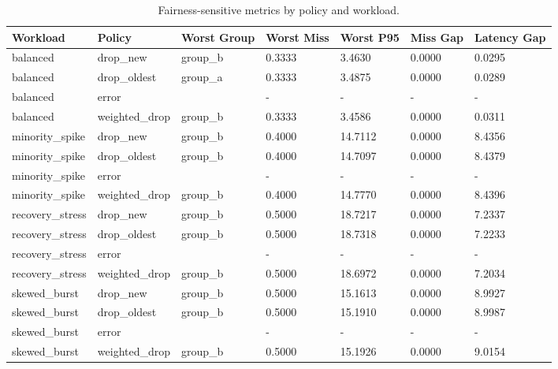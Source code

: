 \begin{table}[t]
\centering
\caption{Fairness-sensitive metrics by policy and workload.}
\label{tab:fairness_metrics}
\begin{tabular}{lllllll}
\hline
Workload & Policy & Worst Group & Worst Miss & Worst P95 & Miss Gap & Latency Gap \\
\hline
balanced & drop\_new & group\_b & 0.3333 & 3.4630 & 0.0000 & 0.0295 \\
balanced & drop\_oldest & group\_a & 0.3333 & 3.4875 & 0.0000 & 0.0289 \\
balanced & error &  & - & - & - & - \\
balanced & weighted\_drop & group\_b & 0.3333 & 3.4586 & 0.0000 & 0.0311 \\
minority\_spike & drop\_new & group\_b & 0.4000 & 14.7112 & 0.0000 & 8.4356 \\
minority\_spike & drop\_oldest & group\_b & 0.4000 & 14.7097 & 0.0000 & 8.4379 \\
minority\_spike & error &  & - & - & - & - \\
minority\_spike & weighted\_drop & group\_b & 0.4000 & 14.7770 & 0.0000 & 8.4396 \\
recovery\_stress & drop\_new & group\_b & 0.5000 & 18.7217 & 0.0000 & 7.2337 \\
recovery\_stress & drop\_oldest & group\_b & 0.5000 & 18.7318 & 0.0000 & 7.2233 \\
recovery\_stress & error &  & - & - & - & - \\
recovery\_stress & weighted\_drop & group\_b & 0.5000 & 18.6972 & 0.0000 & 7.2034 \\
skewed\_burst & drop\_new & group\_b & 0.5000 & 15.1613 & 0.0000 & 8.9927 \\
skewed\_burst & drop\_oldest & group\_b & 0.5000 & 15.1910 & 0.0000 & 8.9987 \\
skewed\_burst & error &  & - & - & - & - \\
skewed\_burst & weighted\_drop & group\_b & 0.5000 & 15.1926 & 0.0000 & 9.0154 \\
\hline
\end{tabular}
\end{table}
